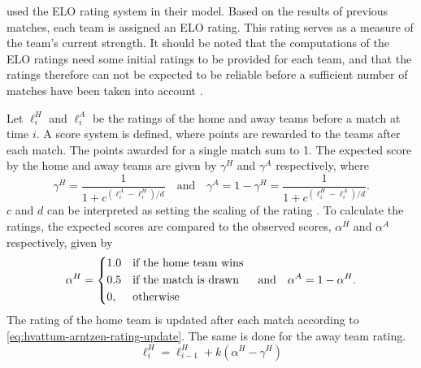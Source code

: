 \citet{bib:hvattum-arntzen-2010} used the ELO rating system in their model. Based on the results of previous matches, each team is assigned an ELO rating. This rating serves as a measure of the team's current strength. It should be noted that the computations of the ELO ratings need some initial ratings to be provided for each team, and that the ratings therefore can not be expected to be reliable before a sufficient number of matches have been taken into account \citep{bib:hvattum-arntzen-2010}.

Let $\ell_{i}^{H}$ and $\ell_{i}^{A}$ be the ratings of the home and away teams before a match at time $i$. A score system is defined, where points are rewarded to the teams after each match. The points awarded for a single match sum to 1. The expected score by the home and away teams are given by $\gamma^{H}$ and $\gamma^{A}$ respectively, where
\begin{equation*}
    \gamma^{H} = \frac{1}{1 + c^{(\ell_{i}^{A} - \ell_{i}^{H}) / d}} \quad \text{and} \quad
    \gamma^{A} = 1 - \gamma^{H} = \frac{1}{1 + c^{(\ell_{i}^{H} - \ell_{i}^{A}) / d}}.
\end{equation*}
$c$ and $d$ can be interpreted as setting the scaling of the rating \citep{bib:hvattum-arntzen-2010}. To calculate the ratings, the expected scores are compared to the observed scores, $\alpha^{H}$ and $\alpha^{A}$ respectively, given by
\begin{equation*}
    \alpha^{H} =
    \begin{dcases}
        1.0     & \text{if the home team wins} \\
        0.5     & \text{if the match is drawn} \\
        0,      & \text{otherwise}
    \end{dcases}
    \quad \text{and} \quad
    \alpha^{A} = 1 - \alpha^{H}.
\end{equation*}
The rating of the home team is updated after each match according to \cref{eq:hvattum-arntzen-rating-update}. The same is done for the away team rating.
\begin{equation}
    \ell_{i}^{H} = \ell_{i-1}^{H} + k (\alpha^{H} - \gamma^{H})
    \label{eq:hvattum-arntzen-rating-update}
\end{equation}

